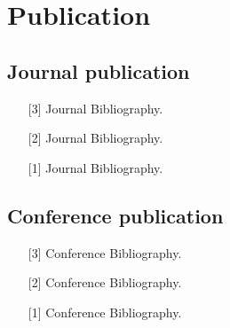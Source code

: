 \chapter*{Publication}
\section*{Journal publication}
\begin{itemize}
\setlength{\itemsep}{\baselineskip}
\setlength{\parskip}{0pt}
\item[{[3]}] Journal Bibliography.
\item[{[2]}] Journal Bibliography.
\item[{[1]}] Journal Bibliography.
\end{itemize}

\section*{Conference publication}
\begin{itemize}
\setlength{\itemsep}{\baselineskip}
\setlength{\parskip}{0pt}
\item[{[3]}] Conference Bibliography.
\item[{[2]}] Conference Bibliography.
\item[{[1]}] Conference Bibliography.
\end{itemize}

